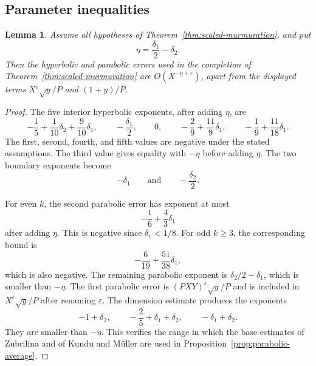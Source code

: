 \documentclass[12pt,reqno]{amsart}
\numberwithin{equation}{section}
\theoremstyle{plain}
\newtheorem{lemma}[theorem]{Lemma}
\theoremstyle{definition}
\theoremstyle{remark}
\begin{document}
\subsection{Parameter inequalities}

\begin{lemma}
\label{lemParameterAudit}
Assume all hypotheses of Theorem~\ref{thm:scaled-murmuration}, and put
\begin{equation*}
\eta=\frac{\delta_1}{2}-\delta_2.
\end{equation*}
Then the hyperbolic and parabolic errors used in the completion of Theorem~\ref{thm:scaled-murmuration} are
$O(X^{-\eta+\varepsilon})$, apart from the displayed terms $X^\varepsilon\sqrt y/P$ and $(1+y)/P$.
\end{lemma}

\begin{proof}
The five interior hyperbolic exponents, after adding $\eta$, are
\begin{equation*}
-\frac15+\frac1{10}\delta_2+\frac9{10}\delta_1,\qquad
-\frac{\delta_1}{2},\qquad
0,\qquad
-\frac29+\frac{11}{9}\delta_1,\qquad
-\frac19+\frac{11}{18}\delta_1.
\end{equation*}
The first, second, fourth, and fifth values are negative under the stated assumptions.
The third value gives equality with
$-\eta$ before adding $\eta$.
The two boundary exponents become
\begin{equation*}
-\delta_1
\qquad\text{and}\qquad
-\frac{\delta_2}{2}.
\end{equation*}

For even $k$, the second parabolic error has exponent at most
\begin{equation*}
-\frac16+\frac43\delta_1
\end{equation*}
after adding $\eta$.
This is negative since $\delta_1<1/8$.
For odd $k\geq3$, the corresponding bound is
\begin{equation*}
-\frac6{19}+\frac{51}{38}\delta_1,
\end{equation*}
which is also negative.
The remaining parabolic exponent is $\delta_2/2-\delta_1$, which is smaller than $-\eta$.
The first parabolic error is $(PXY)^\varepsilon\sqrt y/P$ and is included in $X^\varepsilon\sqrt y/P$ after renaming $\varepsilon$.
The dimension estimate produces the exponents
\begin{equation*}
-1+\delta_2,\qquad
-\frac25+\delta_1+\delta_2,\qquad
-\delta_1+\delta_2.
\end{equation*}
They are smaller than $-\eta$.
This verifies the range in which the base estimates of Zubrilina and of Kundu and M\"uller are used in Proposition~\ref{prop:parabolic-average}.
\end{proof}
\end{document}
